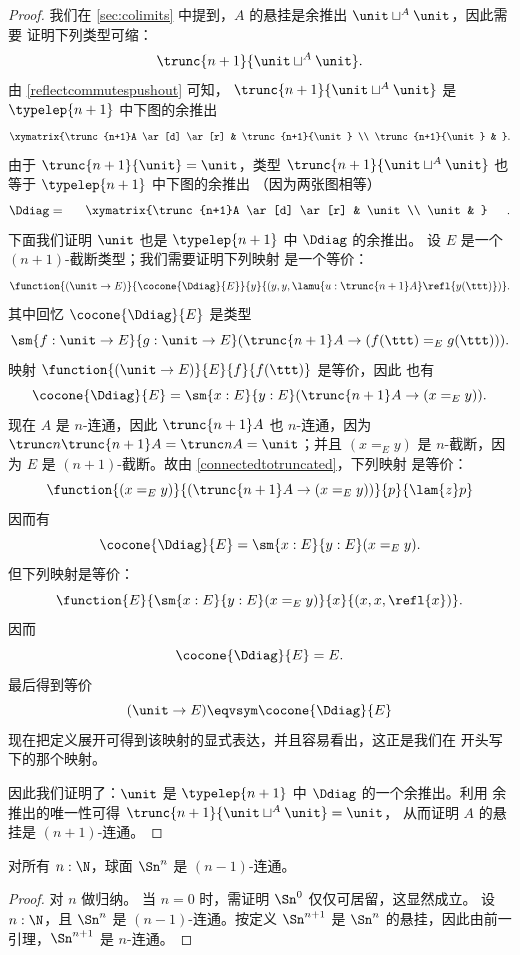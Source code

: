 \begin{proof}
  我们在 \cref{sec:colimits} 中提到，$A$ 的悬挂是余推出 $\unit\sqcup^A\unit$，因此需要
  证明下列类型可缩：
  \[\trunc{n+1}{\unit\sqcup^A\unit}.\]
  由 \cref{reflectcommutespushout} 可知，
  $\trunc{n+1}{\unit\sqcup^A\unit}$ 是 $\typelep{n+1}$ 中下图的余推出
  \[\xymatrix{\trunc{n+1}A \ar[d] \ar[r] & \trunc{n+1}{\unit} \\
    \trunc{n+1}{\unit} & }.\]
  由于 $\trunc{n+1}{\unit}=\unit$，类型
  $\trunc{n+1}{\unit\sqcup^A\unit}$ 也等于 $\typelep{n+1}$ 中下图的余推出
  （因为两张图相等）
  \[\Ddiag=\vcenter{\xymatrix{\trunc{n+1}A \ar[d] \ar[r] & \unit \\
    \unit & }}.\]
  下面我们证明 $\unit$ 也是 $\typelep{n+1}$ 中 $\Ddiag$ 的余推出。
  设 $E$ 是一个 $(n+1)$-截断类型；我们需要证明下列映射
  是一个等价：
  \[\function{(\unit \to E)}{\cocone{\Ddiag}{E}}{y}
  {(y,y,\lamu{u:{\trunc{n+1}A}} \refl{y(\ttt)})}.\]
  其中回忆 $\cocone{\Ddiag}{E}$ 是类型
  \[\sm{f:\unit \to E}{g:\unit \to E}(\trunc{n+1}A\to
  (f(\ttt)=_E{}g(\ttt))).\]
  映射 $\function{(\unit\to E)}{E}{f}{f(\ttt)}$ 是等价，因此
  也有
  \[\cocone{\Ddiag}{E}=\sm{x:E}{y:E}(\trunc{n+1}A\to(x=_Ey)).\]
  现在 $A$ 是 $n$-连通，因此 $\trunc{n+1}A$ 也 $n$-连通，因为
  $\trunc n{\trunc{n+1}A}=\trunc nA=\unit$；并且 $(x=_Ey)$ 是 $n$-截断，因为
  $E$ 是 $(n+1)$-截断。故由 \cref{connectedtotruncated}，下列映射
  是等价：
  \[\function{(x=_Ey)}{(\trunc{n+1}A\to(x=_Ey))}{p}{\lam{z} p}\]
  因而有
  \[\cocone{\Ddiag}{E}=\sm{x:E}{y:E}(x=_Ey).\]
  但下列映射是等价：
  \[\function{E}{\sm{x:E}{y:E}(x=_Ey)}{x}{(x,x,\refl{x})}.\]
  因而
  \[\cocone{\Ddiag}{E}=E.\]
  最后得到等价
  \[(\unit \to E)\eqvsym\cocone{\Ddiag}{E}\]
  现在把定义展开可得到该映射的显式表达，并且容易看出，这正是我们在
  开头写下的那个映射。

  因此我们证明了：$\unit$ 是 $\typelep{n+1}$ 中 $\Ddiag$ 的一个余推出。利用
  余推出的唯一性可得 $\trunc{n+1}{\unit\sqcup^A\unit}=\unit$，
  从而证明 $A$ 的悬挂是 $(n+1)$-连通。
\end{proof}

\begin{cor} \label{cor:sn-connected}
  对所有 $n:\N$，球面 $\Sn^n$ 是 $(n-1)$-连通。
\end{cor}

\begin{proof}
  对 $n$ 做归纳。
  当 $n=0$ 时，需证明 $\Sn^0$ 仅仅可居留，这显然成立。
  设 $n:\N$，且 $\Sn^n$ 是 $(n-1)$-连通。按定义 $\Sn^{n+1}$
  是 $\Sn^n$ 的悬挂，因此由前一引理，$\Sn^{n+1}$ 是
  $n$-连通。
\end{proof}
